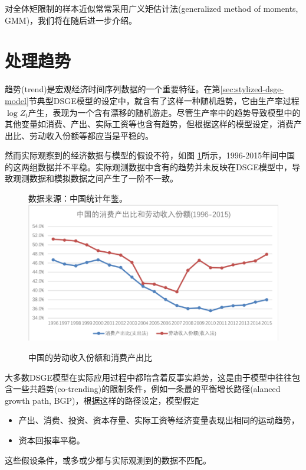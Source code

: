 对全体矩限制的样本近似常常采用广义矩估计法(generalized method of moments, GMM)，我们将在随后进一步介绍。%

\section{处理趋势}
\label{sec:stylized-ssrep-empirics-trends}
趋势(trend)是宏观经济时间序列数据的一个重要特征。在第\ref{sec:stylized-dsge-model}节典型DSGE模型的设定中，就含有了这样一种随机趋势，它由生产率过程$\log Z_{t}$产生，表现为一个含有漂移的随机游走。尽管生产率中的趋势导致模型中的其他变量如消费、产出、实际工资等也含有趋势，但根据这样的模型设定，消费产出比、劳动收入份额等都应当是平稳的。

然而实际观察到的经济数据与模型的假设不符，如图  \ref{fig:stylized-ssrep-empirics-ratio-yl-cy}所示，1996-2015年间中国的这两组数据并不平稳。实际观测数据中含有的趋势并未反映在DSGE模型中，导致观测数据和模拟数据之间产生了一阶不一致。
\begin{figure}[htbp]
  \caption{中国的劳动收入份额和消费产出比}\small{数据来源：中国统计年鉴。}
  \centering
  \includegraphics[width=12cm]{./Figures/20180409-ratio-yl-cy}
  \label{fig:stylized-ssrep-empirics-ratio-yl-cy}
%
\end{figure}

大多数DSGE模型在实际应用过程中都暗含着反事实趋势，这是由于模型中往往包含一些共趋势(co-trending)的限制条件\citep{Hatanaka:2012bo}，例如一条最的平衡增长路径(alanced growth path, BGP)，根据这样的路径设定，模型假定
\begin{itemize}
  \item 产出、消费、投资、资本存量、实际工资等经济变量表现出相同的运动趋势，
  \item 资本回报率平稳。
\end{itemize}
这些假设条件，或多或少都与实际观测到的数据不匹配。

